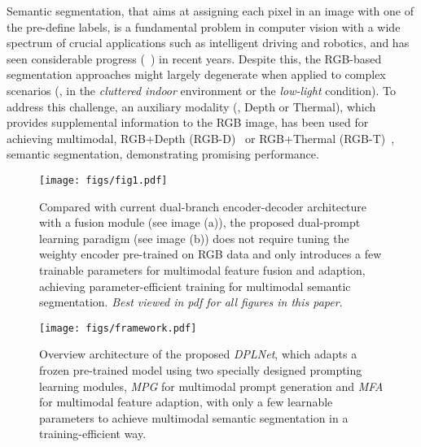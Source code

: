 \documentclass[10pt,twocolumn,letterpaper]{article}
\begin{document}
Semantic segmentation, that aims at assigning each pixel in an image with one of the pre-define labels, is a fundamental problem in computer vision with a wide spectrum of crucial applications such as intelligent driving and robotics, and has seen considerable progress (\eg~\cite{segformer,chen2017deeplab,long2015fully,fan2018multi,pvt,maskformer,strudel2021segmenter}) in recent years. Despite this, the RGB-based segmentation approaches might largely degenerate when applied to complex scenarios 
(\eg, in the \emph{cluttered indoor} environment or the \emph{low-light} condition). To address this challenge, an auxiliary modality (\eg, Depth or Thermal), which provides supplemental information to the RGB image, has been used for achieving multimodal, RGB+Depth (RGB-D)~\cite{wang2016learning,SA-gate,shapeconv,CMX,CMNext} or RGB+Thermal (RGB-T)~\cite{mfnet,RTFNet,EGFNet,CMX,CMNext}, semantic segmentation, demonstrating promising performance.

\begin{figure}[t]
 \centering
 \texttt{[image: figs/fig1.pdf]}
\caption{Compared with current dual-branch encoder-decoder architecture with a fusion module (see image (a)), the proposed dual-prompt learning paradigm (see image (b)) does not require tuning the weighty encoder pre-trained on RGB data and only introduces a few trainable parameters for multimodal feature fusion and adaption, achieving parameter-efficient training for multimodal semantic segmentation. \emph{Best viewed in pdf for all figures in this paper}.}
 \label{fig:comp}
 \vspace{-1em}
\end{figure}

\begin{figure*}[!t]
 \centering
 \texttt{[image: figs/framework.pdf]}
\caption{Overview architecture of the proposed \emph{DPLNet}, which adapts a frozen pre-trained model using two specially designed prompting learning modules, \emph{MPG} for multimodal prompt generation and \emph{MFA} for multimodal feature adaption, with only a few learnable parameters to achieve multimodal semantic segmentation in a training-efficient way.}
 \label{fig:framework}
 \vspace{-2mm}
\end{figure*}
\end{document}
